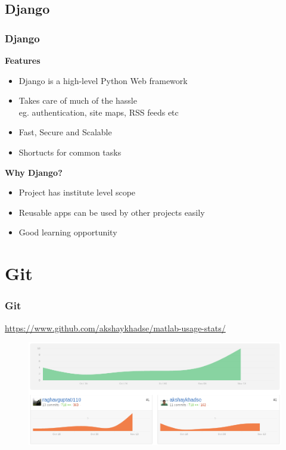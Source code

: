 \documentclass{beamer}
\begin{document}
\subsection{Django}
\begin{frame}
    \frametitle{Django}
    \textbf{Features}
    \begin{itemize}
        \item Django is a high-level Python Web framework
        \item Takes care of much of the hassle \\eg. authentication, site maps, RSS feeds etc
        \item Fast, Secure and Scalable
        \item Shortucts for common tasks
    \end{itemize}
    \textbf{Why Django?}
    \begin{itemize}
        \item Project has institute level scope
        \item Reusable apps can be used by other projects easily
        \item Good learning opportunity
    \end{itemize}
\end{frame}

\section{Git}
\begin{frame}
    \frametitle{Git}
    \url{https://www.github.com/akshaykhadse/matlab-usage-stats/}
    \begin{figure}
        \centering
        \includegraphics[scale=0.35]{github}
    \end{figure}
\end{frame}
\end{document}
